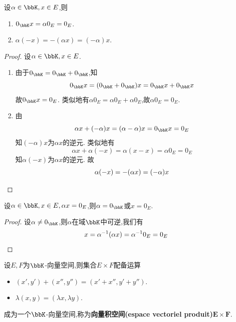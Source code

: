 \begin{prop}
    设$\alpha \in \bbK, x \in E$,则
    \begin{enumerate}
        \item $0_{\bbK} x = \alpha 0_E = 0_E$.
        \item $\alpha (- x) = - (\alpha x) = (-\alpha) x$.
    \end{enumerate}
\end{prop}

\begin{proof}
    设$\alpha \in \bbK, x \in E$.
    \begin{enumerate}
        \item 由于$0_\bbK = 0_\bbK + 0_\bbK$,知\[ 0_\bbK x = (0_\bbK + 0_\bbK) x = 0_\bbK x + 0_\bbK x \]故$0_\bbK x = 0_E$.
            类似地有$\alpha 0_E = \alpha 0_E + \alpha 0_E$,故$\alpha 0_E = 0_E$.
        \item 由\[ \alpha x + (-\alpha)x = (\alpha - \alpha)x = 0_\bbK x = 0_E \]知$(-\alpha)x$为$\alpha x$的逆元.
            类似地有\[ \alpha x + \alpha (-x) = \alpha (x - x) = \alpha 0_E = 0_E \]知$\alpha (-x)$为$\alpha x$的逆元.
            故\[ \alpha (- x) = - (\alpha x) = (-\alpha) x \qedhere \]
    \end{enumerate}
\end{proof}

\begin{prop}
    设$\alpha \in \bbK, x \in E, \alpha x = 0_E$,则$\alpha = 0_{\bbK}$或$x = 0_E$.
\end{prop}

\begin{proof}
    设$\alpha \neq 0_\bbK$,则$\alpha$在域$\bbK$中可逆,我们有\[ x = \alpha^{-1} (\alpha x) = \alpha^{-1} 0_E = 0_E \qedhere \]
\end{proof}

\begin{deff}
    设$E, F$为$\bbK$-向量空间,则集合$E \times F$配备运算
    \begin{itemize}
        \item $(x', y') + (x'', y'') = (x' + x'', y' + y'')$.
        \item $\lambda (x, y) = (\lambda x, \lambda y)$.
    \end{itemize}
    成为一个$\bbK$-向量空间,称为\textbf{向量积空间(espace vectoriel produit)$\boldsymbol{E \times F}$}.
\end{deff}

